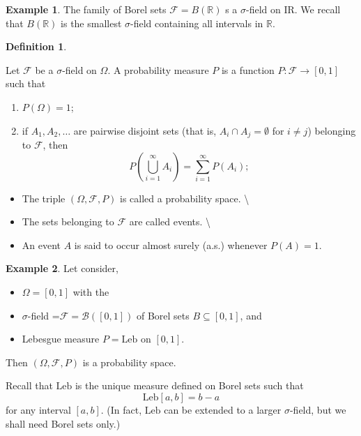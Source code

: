 \documentclass[
]{book}
\providecommand{\tightlist}{%
  \setlength{\itemsep}{0pt}\setlength{\parskip}{0pt}}
\theoremstyle{definition}
\newtheorem{definition}{Definition}[chapter]
\theoremstyle{definition}
\newtheorem{example}{Example}[chapter]
\theoremstyle{definition}
\theoremstyle{definition}
\theoremstyle{remark}
\begin{document}
\begin{example}
\protect\hypertarget{exm:unnamed-chunk-8}{}\label{exm:unnamed-chunk-8}The family of Borel sets \(\mathcal{F}= B(\mathbb{R})\) s a \(\sigma\)-field on IR. We recall that \(B(\mathbb{R})\) is the smallest \(\sigma\)-field containing all intervals in \(\mathbb{R}\).
\end{example}

\begin{definition}
\protect\hypertarget{def:unnamed-chunk-9}{}\label{def:unnamed-chunk-9}

Let \(\mathcal{F}\) be a \(\sigma\)-field on \(\Omega\). A probability measure \(P\) is a function
\(P : \mathcal{F} \to [0, 1]\)
such that

\begin{enumerate}
\def\labelenumi{\arabic{enumi}.}
\tightlist
\item
  \(P(\Omega) = 1\);
\item
  if \(A_1, A_2, \ldots\) are pairwise disjoint sets (that is, \(A_i \cap A_j = \emptyset\) for \(i \neq j\)) belonging to \(\mathcal{F}\), then
  \[
  P\left(\bigcup_{i=1}^{\infty} A_i\right) = \sum_{i=1}^{\infty} P(A_i);
  \]
\end{enumerate}

\begin{itemize}
\tightlist
\item
  The triple \((\Omega, \mathcal{F}, P)\) is called a probability space. \textbackslash{}
\item
  The sets belonging to \(\mathcal{F}\) are called events. \textbackslash{}
\item
  An event \(A\) is said to occur almost surely (a.s.) whenever \(P(A) = 1\).
\end{itemize}

\end{definition}

\begin{example}
\protect\hypertarget{exm:unnamed-chunk-10}{}\label{exm:unnamed-chunk-10}Let consider,

\begin{itemize}
\tightlist
\item
  \(\Omega=[0, 1]\) with the
\item
  \(\sigma\)-field =\(\mathcal{F} = \mathcal{B}([0, 1])\) of Borel sets \(B \subseteq [0, 1]\), and
\item
  Lebesgue measure \(P = \text{Leb}\) on \([0, 1]\).
\end{itemize}

Then \((\Omega, \mathcal{F}, P)\) is a probability space.

Recall that \(\text{Leb}\) is the unique measure defined on Borel sets such that
\[\text{Leb}[a, b] = b - a\]
for any interval \([a, b]\). (In fact, \(\text{Leb}\) can be extended to a larger \(\sigma\)-field, but we shall need Borel sets only.)
\end{example}
\end{document}
